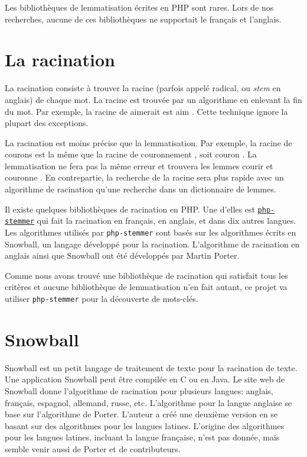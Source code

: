 Les biblioth\`eques de lemmatisation écrites en PHP sont rares.
Lors de nos recherches, aucune de ces biblioth\`eques ne supportait le français et l'anglais.

\section{La racination}

La racination consiste à trouver la racine (parfois appelé radical, ou \emph{stem} en anglais) de chaque mot.
La racine est trouvée par un algorithme en enlevant la fin du mot.
Par exemple, la racine de \og aimerait \fg{} est \og aim \fg{}.
Cette technique ignore la plupart des exceptions.

La racination est moins précise que la lemmatisation.
Par exemple, la racine de \og courons \fg{} est la même que la racine de \og couronnement \fg{}, soit \og couron \fg{}.
La lemmatisation ne fera pas la même erreur et trouvera les lemmes \og courir \fg{} et \og couronne \fg{}.
En contrepartie, la recherche de la racine sera plus rapide avec un algorithme de racination qu'une recherche dans un dictionnaire de lemmes.

Il existe quelques biblioth\`eques de racination en PHP.
Une d'elles est \href{https://github.com/wamania/php-stemmer}{\texttt{php-stemmer}} qui fait la racination en français, en anglais, et dans dix autres langues.
Les algorithmes utilisés par \texttt{php-stemmer} sont basés sur les algorithmes écrits en Snowball, un langage développé pour la racination.
L'algorithme de racination en anglais ainsi que Snowball ont été développés par Martin Porter.


Comme nous avons trouvé une biblioth\`eque de racination qui satisfait tous les critères et aucune biblioth\`eque de lemmatisation n'en fait autant, ce projet va utiliser \texttt{php-stemmer} pour la découverte de mots-clés.

\section{Snowball}

Snowball est un petit langage de traitement de texte pour la racination de texte.
Une application Snowball peut être compilée en C ou en Java.
Le site web de Snowball donne l'algorithme de racination pour plusieurs langues: anglais, français, espagnol, allemand, russe, etc.
L'algorithme pour la langue anglaise se base sur l'algorithme de Porter.
%
%
L'auteur a créé une deuxième version en se basant sur des algorithmes pour les langues latines.
L'origine des algorithmes pour les langues latines, incluant la langue française, n'est pas donnée, mais semble venir aussi de Porter et de contributeurs.

